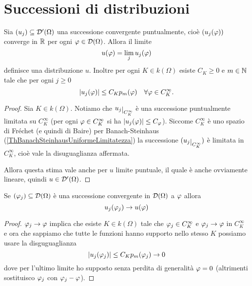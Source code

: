 \section{Successioni di distribuzioni}
\begin{proposition}[]\label{PrSuccessioniDiDistribuzioni}
Sia $(u_j)\subseteq \mathcal{D}'(\Omega)$ una successione convergente puntualmente, cio\`e $(u_j(\varphi))$ converge in $\mathbb{R}$ per ogni $\varphi\in \mathcal{D}(\Omega)$. Allora il limite
\[u(\varphi)=\lim_{j}u_j(\varphi)\]
definisce una distribuzione $u$. Inoltre per ogni $K\in k(\Omega)$ esiste $C_K\geq 0$ e $m\in\mathbb{N}$ tale che per ogni $j\geq 0$
\[\left|{u_j(\varphi)}\right|\leq C_Kp_m(\varphi)\quad\forall \varphi\in C^\infty_K.\]
\end{proposition}
\begin{proof}
Sia $K\in k(\Omega)$. Notiamo che $u_j\res{C^\infty_K}$ \`e una successione puntualmente limitata su $C^\infty_K$ (per ogni $\varphi\in C^\infty_K$ si ha $\left|{u_j(\varphi)}\right|\leq C_\varphi$). Siccome $C^\infty_K$ \`e uno spazio di Fr\'echet (e quindi di Baire) per Banach-Steinhaus (\ref{ThBanachSteinhausUniformeLimitatezza}) la successione $(u_j\res{C^\infty_K})$ \`e limitata in $C^\infty_K$, cio\`e vale la disuguaglianza affermata.

Allora questa stima vale anche per $u$ limite puntuale, il quale \`e anche ovviamente lineare, quindi $u\in \mathcal{D}'(\Omega)$.
\end{proof}

\begin{corollary}
    Se $(\varphi_j)\subseteq\mathcal{D}(\Omega)$ \`e una successione convergente in $\mathcal{D}(\Omega)$ a $\varphi$ allora
    \[u_j(\varphi_j)\to u(\varphi)\]
\end{corollary}
\begin{proof}
$\varphi_j\to \varphi$ implica che esiste $K\in k(\Omega)$ tale che $\varphi_j\in C^\infty_K$ e $\varphi_j\to \varphi$ in $C^\infty_K$ e ora che sappiamo che tutte le funzioni hanno supporto nello stesso $K$ possiamo usare la disguguaglianza
\[\left|{u_j(\varphi_j)}\right|\leq C_Kp_m(\varphi_j)\to 0\]
dove per l'ultimo limite ho supposto senza perdita di generalit\`a $\varphi=0$ (altrimenti sostituisco $\varphi_j$ con $\varphi_j-\varphi$).
\end{proof}


